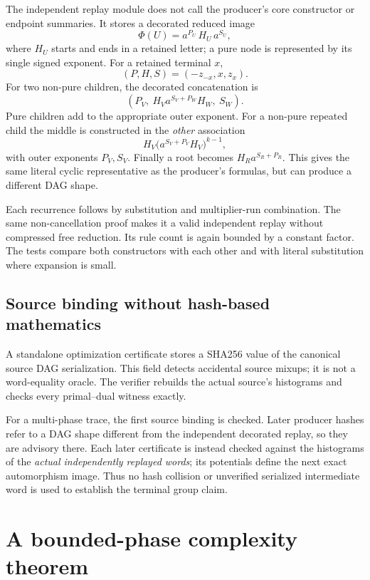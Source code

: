 \documentclass[11pt,letterpaper]{article}
\theoremstyle{definition}
\theoremstyle{remark}\newtheorem{remark}[theorem]{Remark}
\begin{document}
The independent replay module  does not call the
producer's core constructor or endpoint summaries. It stores a decorated
reduced image
\[
 \Phi(U)=a^{P_U}\,H_U\,a^{S_U},
\]
where $H_U$ starts and ends in a retained letter; a pure node is represented
by its single signed exponent. For a retained terminal $x$,
\[
 (P,H,S)=(-z_{-x},x,z_x).
\]
For two non-pure children, the decorated concatenation is
\[
 (P_V,\ H_Va^{S_V+P_W}H_W,\ S_W).
\]
Pure children add to the appropriate outer exponent. For a non-pure repeated
child the middle is constructed in the \emph{other} association
\[
 H_V\bigl(a^{S_V+P_V}H_V\bigr)^{k-1},
\]
with outer exponents $P_V,S_V$. Finally a root becomes
$H_Ra^{S_R+P_R}$. This gives the same literal cyclic representative as the
producer's formulas, but can produce a different DAG shape.

Each recurrence follows by substitution and multiplier-run combination.
The same non-cancellation proof makes it a valid independent replay without
compressed free reduction. Its rule count is again bounded by a constant
factor. The tests compare both constructors with each other and with literal
substitution where expansion is small.

\subsection{Source binding without hash-based mathematics}

A standalone optimization certificate stores a SHA256 value of the canonical
source DAG serialization. This field detects accidental source mixups; it
is not a word-equality oracle. The verifier rebuilds the actual source's
histograms and checks every primal--dual witness exactly.

For a multi-phase trace, the first source binding is checked. Later producer
hashes refer to a DAG shape different from the independent decorated replay,
so they are advisory there. Each later certificate is instead checked against
the histograms of the \emph{actual independently replayed words}; its
potentials define the next exact automorphism image. Thus no hash collision
or unverified serialized intermediate word is used to establish the terminal
group claim.

\section{A bounded-phase complexity theorem}
\label{sec:phases}
\end{document}
